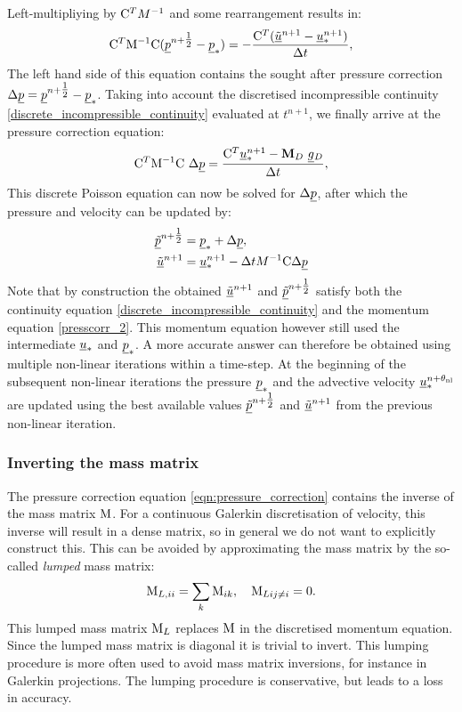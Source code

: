 Left-multipliying by $\mathrm{C}^TM^{-1}$ and
some rearrangement results in:
\begin{equation*}
  \mathrm{C}^T \mathrm{M^{-1}}\mathrm{C} ( \underline{p}^{n+\tfrac 12} -  \underline{p}_*)
  =-\frac{\mathrm{C}^T  ({\underline{\tilde u}^{n+1}-\underline{u}_*^{n+1}})}{\Delta t},
\end{equation*}
The left hand side of this equation contains the sought after pressure
correction $\Delta\underline{p}=\underline{p}^{n+\tfrac 12}-\underline{p}_*$.
Taking into account the discretised incompressible continuity
\eqref{discrete_incompressible_continuity} evaluated at
$t^{n+1}$, we finally arrive at the pressure correction equation:
\begin{equation}
 \mathrm{C}^T \mathrm{M^{-1}}\mathrm{C}~\Delta\underline{p}
   =\frac{ \mathrm{C}^T \underline{u}_*^{n+1}-{\mbox{\boldmath$\mathrm{M}$}}_D ~\underline{g}{}_D}{\Delta t},
   \label{eqn:pressure_correction}
\end{equation}
This discrete Poisson equation can now be solved
for $\Delta\underline{p}$, after which the pressure and velocity can
be updated by:
\begin{equation*}
\begin{split}
  \underline{\tilde p}^{n+\tfrac 12} &= \underline{p}_* + \Delta\underline{p}, \\
  \underline{\tilde u}^{n+1} &= \underline{u}_*^{n+1}
  -\Delta t  M^{-1} \mathrm{C} \Delta\underline{p}
\end{split}
\end{equation*}
Note that by construction the obtained $\underline{\tilde u}^{n+1}$ and
$\underline{\tilde p}^{n+\tfrac 12}$ satisfy both the continuity equation
\eqref{discrete_incompressible_continuity} and the momentum equation
\eqref{presscorr_2}. This momentum equation however still used
the intermediate $\underline{u}_*$ and $\underline{p}_*$.
A more accurate answer can therefore
be obtained using multiple non-linear iterations within a
time-step. At the beginning of the subsequent non-linear iterations
the pressure $\underline{p}_*$ and the advective velocity
$\underline{u}_*^{n+\theta_{\mathrm{nl}}}$ are updated using the best available values
$\underline{\tilde p}^{n+\tfrac 12}$ and $\underline{\tilde u}^{n+1}$ from the previous
non-linear iteration.

\subsubsection{Inverting the mass matrix}
\label{Sect:ND_cg_mass_lumping}
The pressure correction equation \eqref{eqn:pressure_correction} contains
the inverse of the mass matrix $\mathrm{M}$. For a continuous Galerkin
discretisation of velocity, this inverse will result in a dense
matrix, so in general we do not want to explicitly construct
this. This can be avoided by approximating the mass matrix by the
so-called \emph{lumped} mass matrix:
\begin{equation*}
  \mathrm{M}_{L,ii}=\sum_k \mathrm{M}_{ik},\quad \mathrm{M}_{Lij\neq i}=0.
\end{equation*}
This lumped mass matrix $\mathrm{M}_L$ replaces $\mathrm{M}$ in the
discretised momentum equation. Since the lumped mass matrix is
diagonal it is trivial to invert. This lumping procedure is more
often used to avoid mass matrix inversions, for instance in
Galerkin projections. The lumping procedure is conservative,
but leads to a loss in accuracy.

